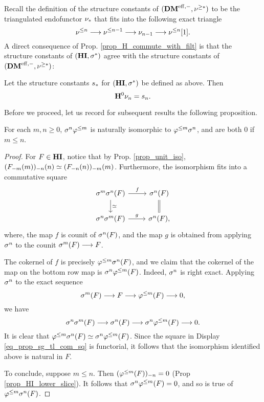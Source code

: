 Recall the definition of the structure constants of $(\DMeff, 
\sgDM{*})$ to be the triangulated endofunctor $\sliceDM{*}$ that
fits into the following exact triangle
\[
\slDM{n} \to \slDM{n - 1} \to \sliceDM{n - 1} \to \slDM{n}[1].
\]
A direct consequence of Prop. \ref{prop_H_commute_with_filt} is 
that the structure constants of $(\HI, \sgHI{*})$ agree with the 
structure constants of $(\DMeff, \sgDM{*})$:

\begin{cor}\label{cor_H_commute_with_slice}
Let the structure constants $\slice{*}$ for $(\HI, \sgHI{*})$ be 
defined as above. Then
\[
\HH^0 \sliceDM{n} = \slice{n}.
\]
\end{cor}

Before we proceed, let us record for subsequent results the 
following proposition.

\begin{prop}\label{prop_sg_tl_commute}
For each $m, n \geq 0$, $\sgHI{n} \tlHI{m}$ is naturally
isomorphic to $\tlHI{m} \sgHI{n}$, and are both 0 if $m \leq n$.
\end{prop}
\begin{proof}
For $F \in \HI$, notice that by Prop. \ref{prop_unit_iso}, 
$\LHI[n]{\RHI[n]{(\LHI[m]{\RHI[m]{F}})}} \simeq
\LHI[m]{\RHI[m]{(\LHI[n]{\RHI[n]{F}})}}$. Furthermore, the 
isomorphism fits into a commutative square
\begin{equation}\label{eq_prop_sg_tl_com_sq}
\begin{tikzcd}
\sgHI{m}\sgHI{n}(F) \arrow{r}{f} \arrow{d}{\simeq} & 
\sgHI{n}(F) \arrow[equal]{d} \\
\sgHI{n}\sgHI{m}(F) \arrow{r}{g} &
\sgHI{n}(F),
\end{tikzcd}
\end{equation}
where, the map $f$ is counit of $\sgHI{n}(F)$, and the map $g$
is obtained from applying $\sgHI{n}$ to the counit $\sgHI{m}(F) 
\to F$.

The cokernel of $f$ is precisely $\tlHI{m} \sgHI{n}(F)$, and we 
claim that the cokernel of the map on the bottom row map is 
$\sgHI{n} \tlHI{m}(F)$. Indeed, $\sgHI{n}$ is right exact. Applying 
$\sgHI{n}$ to the exact sequence
\[
\sgHI{m}(F) \to F \to \tlHI{m}(F) \to 0,
\]
we have
\[
\sgHI{n} \sgHI{m}(F) \to \sgHI{n}(F) \to \sgHI{n} \tlHI{m}(F) \to 0.
\]
It is clear that $\tlHI{m} \sgHI{n}(F) \simeq \sgHI{n} \tlHI{m}(F)$.
Since the square in Display \ref{eq_prop_sg_tl_com_sq} is 
functorial, it follows that the isomorphism identified above is
natural in $F$.

To conclude, suppose $m \leq n$. Then $\RHI[n]{(\tlHI{m}(F))} = 0$
(Prop \ref{prop_HI_lower_slice}). It follows that $\sgHI{n} 
\tlHI{m}(F) = 0$, and so is true of $\tlHI{m} \sgHI{n}(F)$.
\end{proof}

